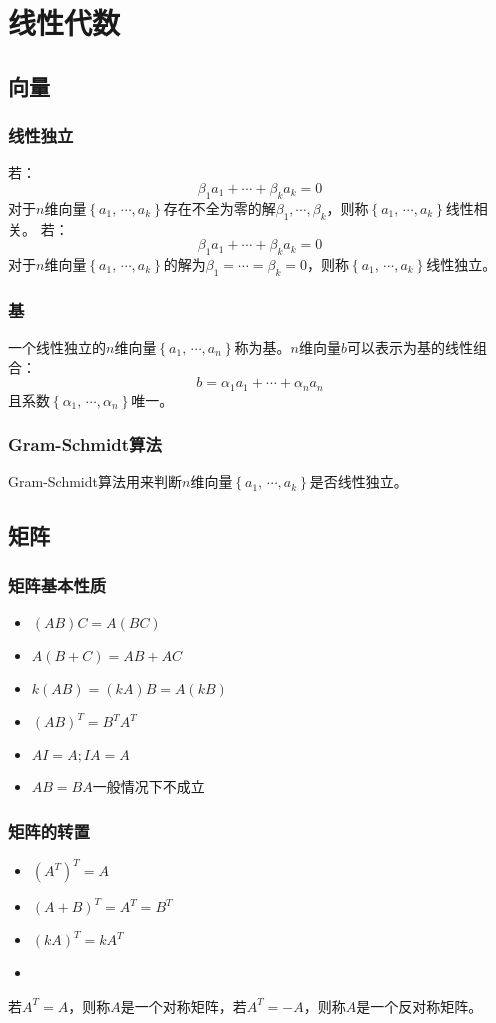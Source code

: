 \chapter{线性代数}
\section{向量}
\subsection{线性独立}
若：
\[\beta_1a_1+\cdots+\beta_ka_k=0\]
对于$ n $维向量$ \left \{ a_1,\,\cdots,a_k \right \} $存在不全为零的解$ \beta_1, \cdots,\beta_k $，则称$ \left \{ a_1,\,\cdots,a_k \right \} $线性相关。\newline
若：
\[\beta_1a_1+\cdots+\beta_ka_k=0\]
对于$ n $维向量$ \left \{ a_1,\,\cdots,a_k \right \} $的解为$ \beta_1=\cdots=\beta_k=0 $，则称$ \left \{ a_1,\,\cdots,a_k \right \} $线性独立。
\subsection{基}
一个线性独立的$ n $维向量$ \left \{ a_1,\,\cdots,a_n \right \} $称为基。$ n $维向量$ b $可以表示为基的线性组合：
\[ b=\alpha_1 a_1+\cdots+\alpha_n a_n \]
且系数$ \left \{ \alpha_1,\,\cdots,\alpha_n \right \} $唯一。
\subsection{Gram-Schmidt算法}
Gram-Schmidt算法用来判断$ n $维向量$ \left \{ a_1,\,\cdots,a_k \right \} $是否线性独立。

\section{矩阵}
\subsection{矩阵基本性质}
\begin{itemize}
	\item $ (AB)C = A(BC) $
	\item $ A(B+C) = AB +AC $
	\item $ k(AB)=(kA)B=A(kB) $
	\item $ (AB)^T=B^TA^T $
	\item $ AI=A; IA=A $
	\item $ AB=BA $一般情况下不成立
\end{itemize}
\subsection{矩阵的转置}
\begin{itemize}
	\item $ (A^T)^T=A$
	\item $ (A+B)^T=A^T=B^T $
	\item $ (kA)^T=kA^T $
	\item {} 
\end{itemize}
若$ A^T=A $，则称$ A $是一个对称矩阵，若$ A^T=-A $，则称$ A $是一个反对称矩阵。
